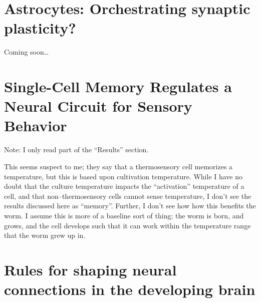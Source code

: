 \documentclass[11pt, a4paper, oneside]{article}   	%
\begin{document}
\section{Astrocytes: Orchestrating synaptic plasticity? \cite{DePitta2016}}

Coming soon\ldots



\section{Single-Cell Memory Regulates a Neural Circuit for Sensory Behavior \cite{Kobayashi2016}}

Note: I only read part of the ``Results'' section.

This seems suspect to me; they say that a thermosensory cell memorizes a temperature, but this is based upon cultivation temperature. While I have no doubt that the culture temperature impacts the ``activation'' temperature of a cell, and that non--thermosensory cells cannot sense temperature, I don't see the results discussed here as ``memory''. Further, I don't see how how this benefits the worm. I assume this is more of a baseline sort of thing; the worm is born, and grows, and the cell develops such that it can work within the temperature range that the worm grew up in.

\section{Rules for shaping neural connections in the developing brain \cite{Kutsarova2016}}
\end{document}
